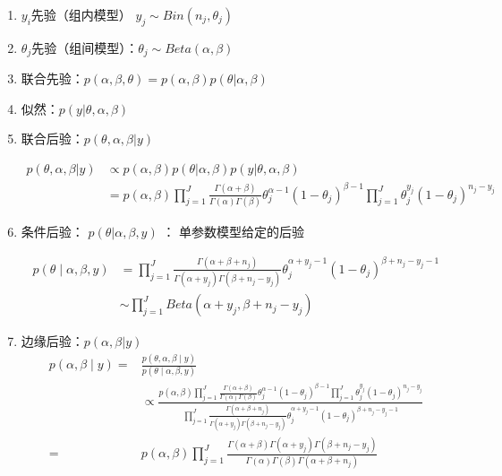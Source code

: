 \begin{enumerate}
\def\labelenumi{\arabic{enumi}.}
\item
  \(y_i\)先验（组内模型） \(y_j \sim Bin(n_j,\theta_j)\)
\item
  \(\theta_j\)先验（组间模型）：\(\theta_j\sim Beta(\alpha,\beta)\)
\item
  联合先验：\(p(\alpha,\beta,\theta)=p(\alpha,\beta)p(\theta|\alpha,\beta)\)
\item
  似然：\(p(y|\theta,\alpha,\beta)\)
\item
  联合后验：\(p(\theta,\alpha,\beta|y)\)

\begin{equation}
  \begin{aligned}
    p(\theta,\alpha,\beta|y)
    &\propto p(\alpha,\beta)p(\theta|\alpha,\beta)p(y|\theta,\alpha,\beta)\\
    &=p(\alpha,\beta)\prod_{j=1}^{J}
    \frac{\Gamma(\alpha+\beta)}{\Gamma(\alpha)\Gamma(\beta)}
    \theta_j^{\alpha-1}(1-\theta_j)^{\beta-1}
    \prod_{j=1}^{J}
    \theta_j^{y_j}(1-\theta_j)^{n_j-y_j}
    \end{aligned}
\end{equation}

\item
  条件后验： \(p(\theta|\alpha,\beta,y)\) ： 单参数模型给定的后验

\begin{equation}
  \begin{aligned}
    p(\theta \mid \alpha, \beta, y)
    &=\prod_{j=1}^{J} \frac{\Gamma\left(\alpha+\beta+n_{j}\right)}{\Gamma\left(\alpha+y_{j}\right) \Gamma\left(\beta+n_{j}-y_{j}\right)} 
    \theta_{j}^{\alpha+y_{j}-1}\left(1-\theta_{j}\right)^{\beta+n_{j}-y_{j}-1}\\
    &\sim \prod _{j=1}^JBeta(\alpha+y_j,\beta+n_j-y_j)
    \end{aligned}
\end{equation}

\item
  边缘后验：\(p(\alpha,\beta|y)\)
\begin{equation}
  \begin{aligned}
    p(\alpha, \beta \mid y)
    =& \frac{p(\theta, \alpha, \beta \mid y)}{p(\theta \mid \alpha, \beta, y)} \\
    &\propto \frac{p(\alpha, \beta) \prod_{j=1}^{J} 
    \frac{\Gamma(\alpha+\beta)}{\Gamma(\alpha) \Gamma(\beta)} 
    \theta_{j}^{\alpha-1}\left(1-\theta_{j}\right)^{\beta-1} \prod_{j=1}^{J} \theta_{j}^{y_{j}}\left(1-\theta_{j}\right)^{n_{j}-y_{j}}}{\prod_{j=1}^{J} 
    \frac{\Gamma\left(\alpha+\beta+n_{j}\right)}{\Gamma\left(\alpha+y_{j}\right) \Gamma\left(\beta+n_{j}-y_{j}\right)} 
    \theta_{j}^{\alpha+y_{j}-1}\left(1-\theta_{j}\right)^{\beta+n_{j}-y_{j}-1}} \\
    =& p(\alpha, \beta) \prod_{j=1}^{J} \frac{\Gamma(\alpha+\beta) \Gamma\left(\alpha+y_{j}\right) 
    \Gamma\left(\beta+n_{j}-y_{j}\right)}{\Gamma(\alpha) \Gamma(\beta) \Gamma\left(\alpha+\beta+n_{j}\right)}
    \end{aligned}
\end{equation}

\end{enumerate}

